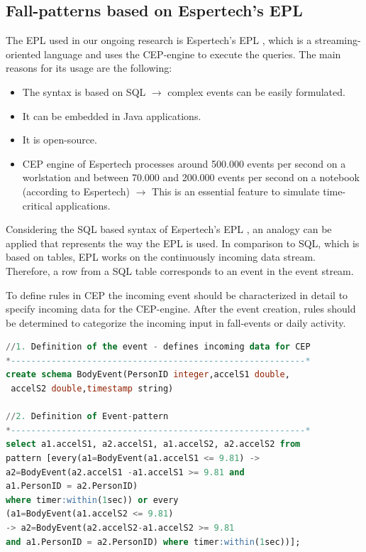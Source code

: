 \documentclass[review]{elsarticle}
\begin{document}
\subsection{Fall-patterns based on Espertech's EPL}
\label{subsec:CEP}
The EPL used in our ongoing research is Espertech's EPL \cite{Esper:2016}, which is a streaming-oriented language and uses the CEP-engine to execute the queries. The main reasons for its usage are the following:
\begin{itemize}
	\item The syntax is based on SQL $\rightarrow$ complex events can be easily formulated.
	\item It can be embedded in Java applications.
	\item It is open-source.
	\item CEP engine of Espertech processes around 500.000 events per second on a worlstation and between 70.000 and 200.000 events per second on a notebook (according to Espertech) $\rightarrow$ This is an essential feature to simulate time-critical applications. 
\end{itemize}
Considering the SQL based syntax of Espertech's EPL \cite{Esper:2016}, an analogy can be applied that represents the way the EPL is used. In comparison to SQL, which is based on tables, EPL works on the continuously incoming data stream. Therefore, a row from a SQL table corresponds to an event in the event stream. 

To define rules in CEP the incoming event should be characterized in detail to specify incoming data for the CEP-engine. After the event creation, rules should be determined to categorize the incoming input in fall-events or daily activity.
 \renewcommand{\lstlistingname}{Example}
\begin{lstlisting}[basicstyle=\ttfamily\footnotesize,language=SQL,caption=Fall pattern based on Kozina et al. \cite{Kozina},label=CEPPattern]
//1. Definition of the event - defines incoming data for CEP
*----------------------------------------------------------*
create schema BodyEvent(PersonID integer,accelS1 double,
 accelS2 double,timestamp string)

//2. Definition of Event-pattern
*----------------------------------------------------------*
select a1.accelS1, a2.accelS1, a1.accelS2, a2.accelS2 from 
pattern [every(a1=BodyEvent(a1.accelS1 <= 9.81) -> 
a2=BodyEvent(a2.accelS1 -a1.accelS1 >= 9.81 and 
a1.PersonID = a2.PersonID) 
where timer:within(1sec)) or every 
(a1=BodyEvent(a1.accelS2 <= 9.81)
-> a2=BodyEvent(a2.accelS2-a1.accelS2 >= 9.81
and a1.PersonID = a2.PersonID) where timer:within(1sec))];
\end{lstlisting}
\end{document}

